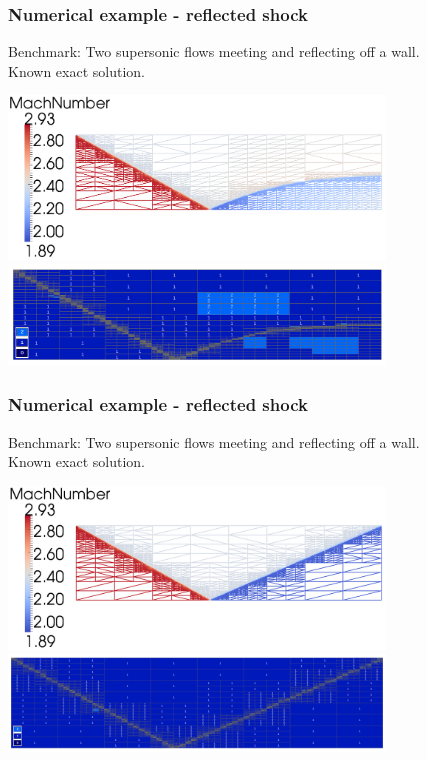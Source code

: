 \documentclass{beamer}
\begin{document}
\begin{frame}
 \frametitle{Numerical example - reflected shock}
	Benchmark: Two supersonic flows meeting and reflecting off a wall.\\
	Known exact solution.
\begin{center}
\includegraphics[width=0.75\textwidth]{refl/screen02-sln.png}\\
\includegraphics[width=0.75\textwidth]{refl/screen002whole.png}
\end{center}
\end{frame}

\begin{frame}
 \frametitle{Numerical example - reflected shock}
	Benchmark: Two supersonic flows meeting and reflecting off a wall.\\
	Known exact solution.
\begin{center}
\includegraphics[width=0.75\textwidth]{refl/screen03-sln.png}\\
\includegraphics[width=0.75\textwidth]{refl/screen003whole.png}
\end{center}
\end{frame}
\end{document}
